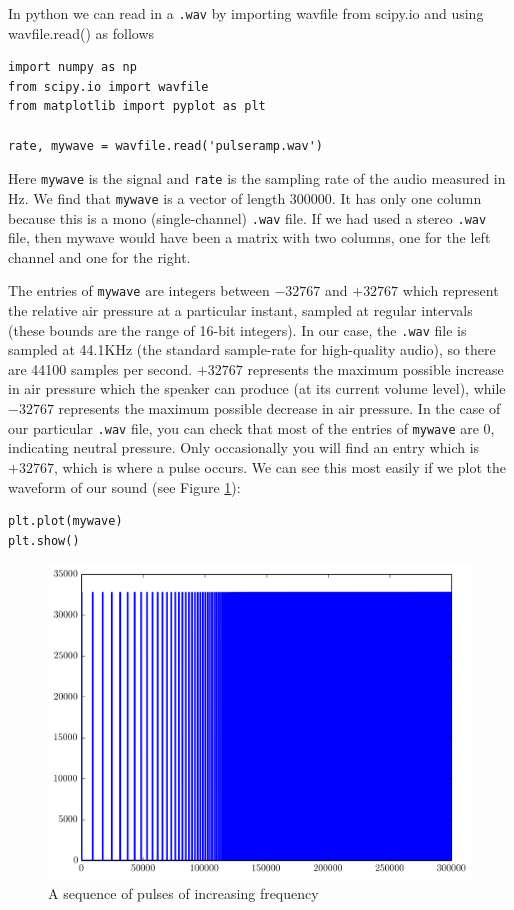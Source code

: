 In python we can read in a \texttt{.wav} by importing wavfile from scipy.io and using wavfile.read() as follows
\begin{lstlisting}
import numpy as np
from scipy.io import wavfile
from matplotlib import pyplot as plt 

rate, mywave = wavfile.read('pulseramp.wav')
\end{lstlisting}
Here \texttt{mywave} is the signal and \texttt{rate} is the sampling rate of the audio measured in Hz. 
% 
We find that \texttt{mywave} is a vector of length $300000$. It has only one column because this is a mono (single-channel) \texttt{.wav} file. 
If we had used a stereo \texttt{.wav} file, then mywave would have been a matrix with two columns, one for the left channel and one for the right.

The entries of \texttt{mywave} are integers between $-32767$ and $+32767$ which represent the relative air pressure at a particular instant, sampled at regular intervals (these bounds are the range of 16-bit integers).   
In our case, the \texttt{.wav} file is sampled at 44.1KHz (the standard sample-rate for high-quality audio), so there are 44100 samples per second. 
$+32767$ represents the maximum possible increase in air pressure which the speaker can produce (at its current volume level), while $-32767$ represents the maximum possible decrease in air pressure. 
In the case of our particular \texttt{.wav} file, you can check that most of the entries of \texttt{mywave} are $0$, indicating neutral pressure. 
Only occasionally you will find an entry which is $+32767$, which is where a pulse occurs.
We can see this most easily if we plot the waveform of our sound (see Figure \ref{pulseramp}):
\begin{lstlisting}
plt.plot(mywave)
plt.show()
\end{lstlisting}
\begin{figure}[ht]\caption{A sequence of pulses of increasing frequency}\label{pulseramp}\centering\includegraphics[width=\textwidth]{pulseramp}\end{figure}


